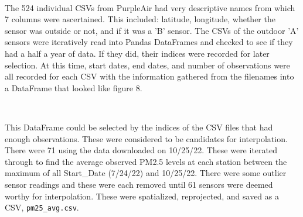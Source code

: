 \documentclass[article,12pt]{article}
\numberwithin{equation}{section}
\begin{document}
\begin{adjustwidth}{-.88in}{-.88in}
	\begin{center}
		\\
		
	\end{center}
\end{adjustwidth}
\vspace{.5in}

The 524 individual CSVs from PurpleAir had very descriptive names from which 7 columns were ascertained. This included: latitude, longitude, whether the sensor was outside or not, and if it was a 'B' sensor. The CSVs of the outdoor 'A' sensors were iteratively read into Pandas DataFrames and checked to see if they had a half a year of data. If they did, their indices were recorded for later selection. At this time, start dates, end dates, and number of observations were all recorded for each CSV with the information gathered from the filenames into a DataFrame that looked like figure 8.

\begin{adjustwidth}{-.88in}{-.88in}
	\begin{center}
		\\
		
	\end{center}
\end{adjustwidth}
\vspace{.5in}

This DataFrame could be selected by the indices of the CSV files that had enough observations. These were considered to be candidates for interpolation. There were 71 using the data downloaded on 10/25/22. These were iterated through to find the average observed PM2.5 levels at each station between the maximum of all Start\_Date (7/24/22) and 10/25/22. There were some outlier sensor readings and these were each removed until 61 sensors were deemed worthy for interpolation. These were spatialized, reprojected, and saved as a CSV, \texttt{pm25\_avg.csv}.
\end{document}
